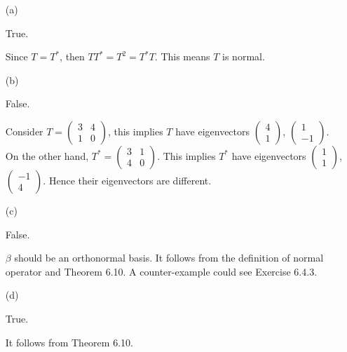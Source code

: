 \begin{Exercise}
\begin{enumerate}[(a)]
\item[(a)]
\begin{answer}
True.
\end{answer}
\begin{solution}
Since $T = T^*$, then $T T^* = T^2 = T^* T$. This means $T$ is normal.
\end{solution}

\item[(b)]
\begin{answer}
False.
\end{answer}
\begin{solution}
Consider $T = \begin{pmatrix}
3 & 4 \\
1 & 0
\end{pmatrix}$, this implies $T$ have eigenvectors $\begin{pmatrix}
4 \\
1
\end{pmatrix}$, $\begin{pmatrix}
1 \\
-1
\end{pmatrix}$. On the other hand, $T^* = \begin{pmatrix}
3 & 1 \\
4 & 0
\end{pmatrix}$. This implies $T^*$ have eigenvectors $\begin{pmatrix}
1 \\
1
\end{pmatrix}$, $\begin{pmatrix}
-1 \\
4
\end{pmatrix}$. Hence their eigenvectors are different.
\end{solution}

\item[(c)]
\begin{answer}
False.
\end{answer}
\begin{solution}
$\beta$ should be an orthonormal basis. It follows from the definition of normal operator and Theorem 6.10. A counter-example could see Exercise 6.4.3.
\end{solution}

\item[(d)]
\begin{answer}
True.
\end{answer}
\begin{solution}
It follows from Theorem 6.10.
\end{solution}


\end{enumerate}
\end{Exercise}
